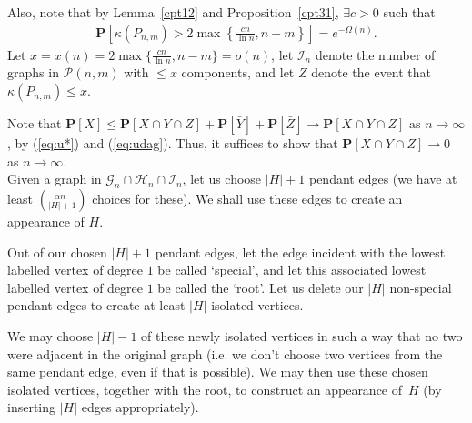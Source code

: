 \documentclass{article}
\newtheorem{Proof of Theorem}{Proof of Theorem}
\begin{document}
Also, note that by Lemma~\ref{cpt12} and Proposition~\ref{cpt31},
$\exists c>0$ such that
\begin{eqnarray}
\mathbf{P} \left[ \kappa \left( P_{n,m} \right)
> 2 \max \left \{ \frac{cn}{\ln n}, n-m \right \} \right] = e^{- \Omega(n)}. \label{eq:udag}
\end{eqnarray} 
Let $x=x(n)= 2 \max \{ \frac{cn}{\ln n}, n-m \} = o(n)$,
let $\mathcal{I}_{n}$ denote the number of graphs in $\mathcal{P}(n,m)$ with $\leq x$ components,
and let $Z$ denote the event that $\kappa \left( P_{n,m} \right) \leq x$.

Note that 
$\mathbf{P}[X] \leq \mathbf{P}[X \cap Y \cap Z] + \mathbf{P} \left[\bar{Y}\right] + \mathbf{P}\left[\bar{Z}\right] 
\to \mathbf{P}[X \cap Y \cap Z] \textrm{ as } n \to \infty$, 
by (\ref{eq:u*}) and (\ref{eq:udag}).
Thus, it suffices to show that $\mathbf{P}[X \cap Y \cap Z] \to 0$ as $n \to \infty$. \\

Given a graph in $\mathcal{G}_{n} \cap \mathcal{H}_{n} \cap \mathcal{I}_{n}$,
let us choose $|H|+1$ pendant edges
(we have at least $\left( ^{\phantom{w} \alpha n}_{|H|+1} \right)$ choices for these).
We shall use these edges to create an appearance of $H$.

Out of our chosen $|H|+1$ pendant edges,
let the edge incident with the lowest labelled vertex of degree $1$ be called `special',
and let this associated lowest labelled vertex of degree $1$ be called the `root'.
Let us delete our $|H|$ non-special pendant edges to create at least $|H|$ isolated vertices.

We may choose $|H|-1$ of these newly isolated vertices in such a way
that no two were adjacent in the original graph
(i.e. we don't choose two vertices from the same pendant edge,
even if that is possible).
We may then use these chosen isolated vertices,
together with the root,
to construct an appearance of~$H$
(by inserting $|H|$ edges appropriately). 
\end{document}
